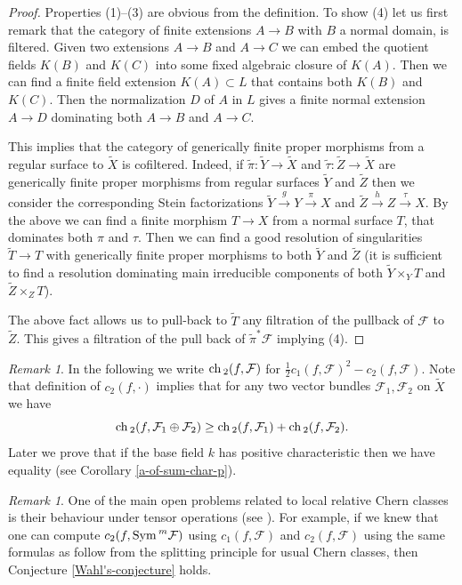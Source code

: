 \documentclass[twoside, 11pt]{article}
\theoremstyle{plain}
\theoremstyle{definition}
\theoremstyle{remark}
\newtheorem{Remark}[Thm]{Remark}
\newcommand{\cF}{{\mathcal F}}
\newcommand{\ch}{{\mathop{\rm ch \, }}}
\newcommand{\Sym}{{\mathop{{\rm Sym \, }}}}
\begin{document}
\begin{proof}
Properties (1)--(3) are obvious from the definition.
To show (4) let us first remark that the category of finite extensions $A\to B$ with $B$ a normal domain, is filtered. 
Given two extensions $A\to B$ and $A\to C$  we can embed the quotient fields $K(B)$ and $K(C)$
into some fixed algebraic closure of $K(A)$. Then we can find a finite field extension $K(A)\subset L$ 
that contains both  $K(B)$ and $K( C)$. Then the normalization $D$ of $A$ in $L$ gives a finite normal 
extension $A\to D$ dominating both $A\to B$ and $A\to C$.

This implies that the category of  generically finite proper morphisms from a regular surface to $\tilde X$ is cofiltered. 
Indeed, if $\tilde \pi: \tilde Y\to \tilde X$ and  $\tilde \tau: \tilde Z\to \tilde X$  are generically finite proper morphisms from regular surfaces $\tilde Y$ and $\tilde Z$ then we consider the corresponding Stein factorizations $\tilde Y\xrightarrow{g} Y\xrightarrow{\pi}X$ and $\tilde Z\xrightarrow{h} Z\xrightarrow{\tau}X$. By the above we can find a finite morphism 
$T\to X$ from a normal surface $T$, that dominates both $\pi$ and $\tau$. Then we can find a good resolution of singularities $\tilde T\to T$ with generically finite proper morphisms to both $\tilde Y$ and $\tilde Z$ (it is sufficient to find a resolution dominating main irreducible components of both $\tilde Y\times _YT$ and $\tilde Z\times _ZT$).

The above fact allows us to pull-back to $\tilde T$ any filtration of  the pullback of $\cF$ to $\tilde Z$. This gives a filtration of the pull back of $\tilde \pi^*\cF$ implying  (4).
\end{proof}


\medskip

\begin{Remark}\label{easy-inequality-for-local-ch_2}
In the following we write $\ch_2 (f, \cF) $ for $ \frac{1}{2} c_1(f, \cF)^2-c_2 (f, \cF) $. Note that definition of $c_2 (f, \cdot)$
implies that for any two vector bundles $\cF_1, \cF_2$ on $\tilde X $ we have
$$\ch_2 (f,\cF _1\oplus \cF_2)\ge \ch_2 (f,\cF _1)+\ch_2 (f,\cF _2).$$
Later we prove that if  the base field $k$ has  positive characteristic then we have equality (see Corollary \ref{a-of-sum-char-p}).  
\end{Remark}


\medskip

\begin{Remark}\label{behaviour-on-tensors}
One of the main open problems related to local relative Chern classes is their behaviour under tensor operations (see \cite[Conjecture 8.1]{La0}). For example, if we knew that one can compute $c_2(f, \Sym ^m\cF)$ using $c_1(f, \cF)$ and $c_2(f, \cF)$ using the same formulas as follow from the splitting principle for usual Chern classes, then Conjecture \ref{Wahl's-conjecture} holds.
\end{Remark}
\end{document}
